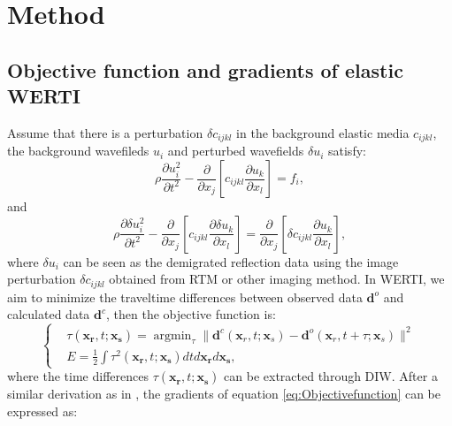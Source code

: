 \section{Method}
\subsection{Objective function and gradients of elastic WERTI}
Assume that there is a perturbation $\delta c_{ijkl}$ in the background elastic media
$c_{ijkl}$, the background wavefileds $u_i$ and perturbed wavefields
$\delta u_i$ satisfy:
\begin{equation}
    \rho \frac{\partial u^2_i}{\partial t^2}  -
    \frac{\partial}{\partial x_j}\left[ 
        c_{ijkl}\frac{\partial u_{k}}{\partial
        x_l}\right]=f_i,
    \label{eq:WE} 
\end{equation}
and
\begin{equation}
    \rho \frac{\partial \delta u^2_i}{\partial t^2}  -
    \frac{\partial}{\partial x_j}\left[ 
        c_{ijkl}\frac{\partial \delta u_{k}}{\partial
        x_l}\right]=\frac{\partial}{\partial x_j}\left[\delta c_{ijkl}\frac{\partial u_{k}}{\partial x_l}\right],
    \label{eq:DeltaWE} 
\end{equation}
where $\delta u_i$ can be seen as the demigrated reflection data using the image
perturbation $\delta c_{ijkl}$ obtained from RTM or other imaging method. In WERTI, we
aim to minimize the traveltime differences between observed data
$\mathbf{d}^{o}$ and
calculated data $\mathbf{d}^{c}$, then
the objective function is:
\begin{equation}
	\left\{
		\begin{aligned}
			&\tau(\mathbf{x_r},t;\mathbf{x_s})=\mathop{\arg\min}_{\tau}
			\parallel\mathbf{d}^{c}(\mathbf{x}_r,t;\mathbf{x}_s)-\mathbf{d}^{o}(\mathbf{x}_r,t+\tau;\mathbf{x}_s)\parallel^2\\
    &E=\frac{1}{2}\int\tau^2(\mathbf{x_r},t;\mathbf{x_s})dtd\mathbf{x_r}d\mathbf{x_s},
		\end{aligned}
	\right.
    \label{eq:Objectivefunction} 
\end{equation}
where the time differences $\tau(\mathbf{x_r},t;\mathbf{x_s})$ can be extracted
through DIW.
After a similar derivation as in \cite{Ma2013}, the gradients of equation \eqref{eq:Objectivefunction} can be expressed as:
